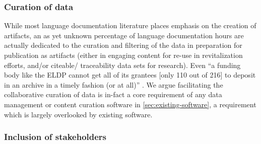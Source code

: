 \documentclass[11pt]{article}
\begin{document}

\subsubsection{Curation of data}


While most language documentation literature places emphasis on the creation of
artifacts, an as yet unknown percentage of language documentation hours are
actually dedicated to the curation and filtering of the data in preparation for
publication as artifacts (either in engaging content for re-use in
revitalization efforts, and/or citeable/ traceability data sets for research).
Even ``a funding body like the ELDP cannot get all of its grantees [only 110
out of 216] to deposit in an archive in a timely fashion (or at all)''
\cite{Thieberger:2012}. We argue facilitating the collaborative curation of
data is in-fact a core requirement of any data management or content curation
software in \autoref{sec:existing-software}, a requirement which is largely
overlooked by existing software.



 
\subsubsection{Inclusion of stakeholders}
\end{document}
